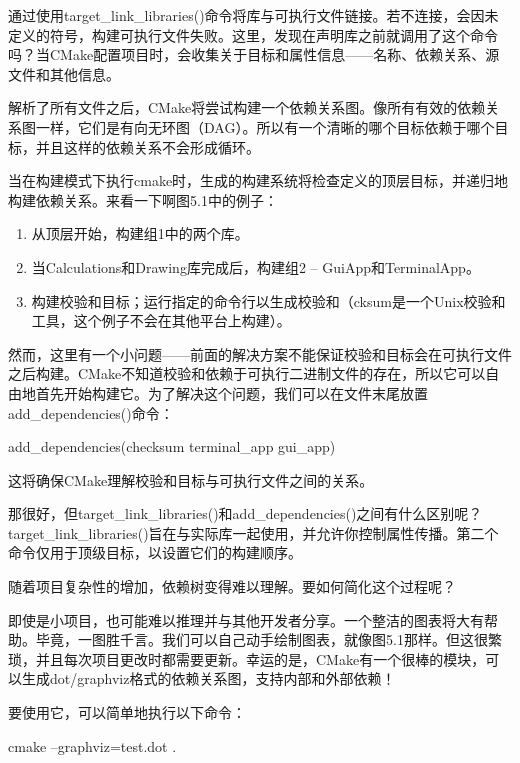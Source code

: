 通过使用target\_link\_libraries()命令将库与可执行文件链接。若不连接，会因未定义的符号，构建可执行文件失败。这里，发现在声明库之前就调用了这个命令吗？当CMake配置项目时，会收集关于目标和属性信息——名称、依赖关系、源文件和其他信息。

解析了所有文件之后，CMake将尝试构建一个依赖关系图。像所有有效的依赖关系图一样，它们是有向无环图（DAG）。所以有一个清晰的哪个目标依赖于哪个目标，并且这样的依赖关系不会形成循环。

当在构建模式下执行cmake时，生成的构建系统将检查定义的顶层目标，并递归地构建依赖关系。来看一下啊图5.1中的例子：

\begin{enumerate}
\item
从顶层开始，构建组1中的两个库。

\item
当Calculations和Drawing库完成后，构建组2 – GuiApp和TerminalApp。

\item
构建校验和目标；运行指定的命令行以生成校验和（cksum是一个Unix校验和工具，这个例子不会在其他平台上构建）。
\end{enumerate}

然而，这里有一个小问题——前面的解决方案不能保证校验和目标会在可执行文件之后构建。CMake不知道校验和依赖于可执行二进制文件的存在，所以它可以自由地首先开始构建它。为了解决这个问题，我们可以在文件末尾放置add\_dependencies()命令：

\begin{cmake}
add_dependencies(checksum terminal_app gui_app)
\end{cmake}

这将确保CMake理解校验和目标与可执行文件之间的关系。

那很好，但target\_link\_libraries()和add\_dependencies()之间有什么区别呢？target\_link\_libraries()旨在与实际库一起使用，并允许你控制属性传播。第二个命令仅用于顶级目标，以设置它们的构建顺序。

随着项目复杂性的增加，依赖树变得难以理解。要如何简化这个过程呢？


即使是小项目，也可能难以推理并与其他开发者分享。一个整洁的图表将大有帮助。毕竟，一图胜千言。我们可以自己动手绘制图表，就像图5.1那样。但这很繁琐，并且每次项目更改时都需要更新。幸运的是，CMake有一个很棒的模块，可以生成dot/graphviz格式的依赖关系图，支持内部和外部依赖！

要使用它，可以简单地执行以下命令：

\begin{shell}
cmake --graphviz=test.dot .
\end{shell}

